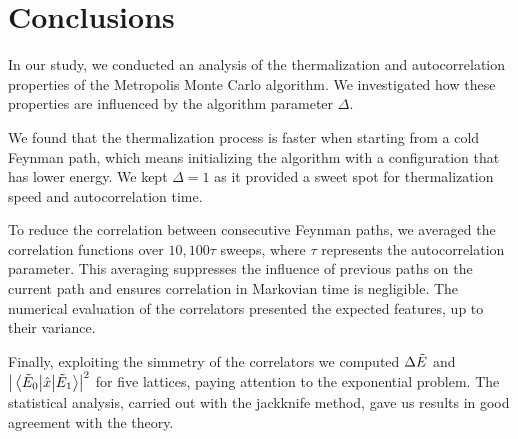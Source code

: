 \section{Conclusions}%
\label{sec:conclusions}
In our study, we conducted an analysis of the thermalization and autocorrelation properties of the Metropolis Monte Carlo algorithm. We investigated how these properties are influenced by the algorithm parameter $\Delta$.

We found that the thermalization process is faster when starting from a cold Feynman path, which means initializing the algorithm with a configuration that has lower energy. We kept $\Delta =1$ as it provided a sweet spot for thermalization speed and autocorrelation time.

To reduce the correlation between consecutive Feynman paths, we averaged the correlation functions over $10,100 \tau$ sweeps, where $\tau$ represents the autocorrelation parameter. This averaging suppresses the influence of previous paths on the current path and ensures correlation in Markovian time is negligible. The numerical evaluation of the correlators presented the expected features, up to their variance.

Finally, exploiting the simmetry of the correlators we computed $\Delta \tilde{E}$ and $\abs{\mel{\tilde{E}_0}{\hat{x}}{\tilde{E}_1}} ^2$ for five lattices, paying attention
to the exponential problem. The statistical analysis, carried out with the jackknife method, gave us results in good agreement with the theory.
